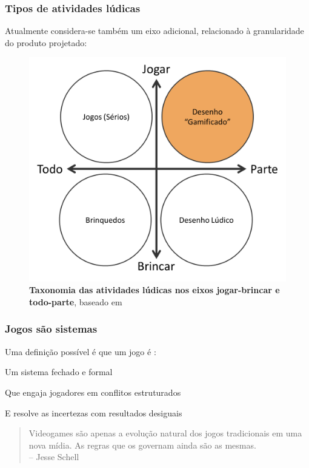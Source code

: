 \expandafter\documentclass\expandafter[table, usenames, svgnames, dvipsnames, \classopts]{beamer}
\begin{document}
\begin{frame} 
	\frametitle{\textbf{Tipos de atividades lúdicas}}

	Atualmente considera-se também um eixo adicional, relacionado à granularidade do produto projetado:
    \begin{figure}
	    \centering
        \includegraphics[height=0.65\paperheight]{taxonomy}
        \caption{\textbf{Taxonomia das atividades lúdicas nos eixos jogar-brincar e todo-parte}, baseado em \cite{Groh2012}}
    \end{figure}

\end{frame}

\begin{frame}
	\frametitle{\textbf{Jogos são sistemas}}
	
	Uma definição possível é que um jogo é \cite{Fullerton2008}:
	
	\begin{outline}
		\1 Um sistema fechado e formal
		
		\vspace{1em}
		
		\1 Que engaja jogadores em conflitos estruturados

		\vspace{1em}
		
		\1 E resolve as incertezas com resultados desiguais
	\end{outline}	

	\vspace{3em}

	\begin{quotation}
		\noindent
		{\large Videogames são apenas a evolução natural dos jogos tradicionais em uma nova mídia. As regras que os governam ainda são as mesmas.\\[0.5em]
		\noindent
		\hfill-- Jesse Schell}
	\end{quotation}

\end{frame}
\end{document}
